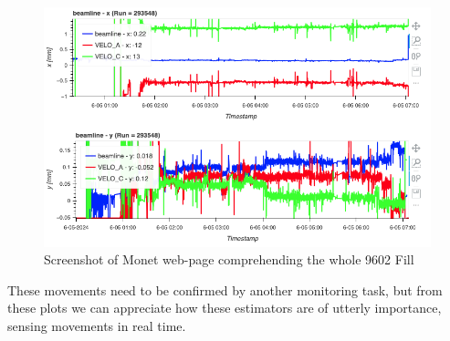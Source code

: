 \begin{figure}
    \centering
    \includegraphics[width=\textwidth]{figures/Fill9602.png}
    \caption{Screenshot of Monet web-page comprehending the whole 9602 Fill}
    \label{fig:fill9602}
\end{figure}

These movements need to be confirmed by another monitoring task, but from these plots we can appreciate how these estimators are of utterly importance, sensing movements in real time.